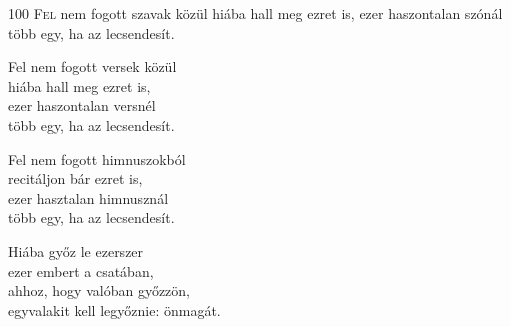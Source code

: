 
\begin{firstdhpverse}{100}
\lettrine{F}{el} {\LettrineTextFont nem fogott szavak közül}\newline
hiába hall meg ezret is,\newline
ezer haszontalan szónál\newline
több egy, ha az lecsendesít.
\end{firstdhpverse}

\begin{dhpverse}

 Fel nem fogott versek közül\\
hiába hall meg ezret is,\\
ezer haszontalan versnél\\
több egy, ha az lecsendesít.

 Fel nem fogott himnuszokból\\
recitáljon bár ezret is,\\
ezer hasztalan himnusznál\\
több egy, ha az lecsendesít.

 Hiába győz le ezerszer\\
ezer embert a csatában,\\
ahhoz, hogy valóban győzzön,\\
egyvalakit kell legyőznie: önmagát.

\end{dhpverse}
\newpage

